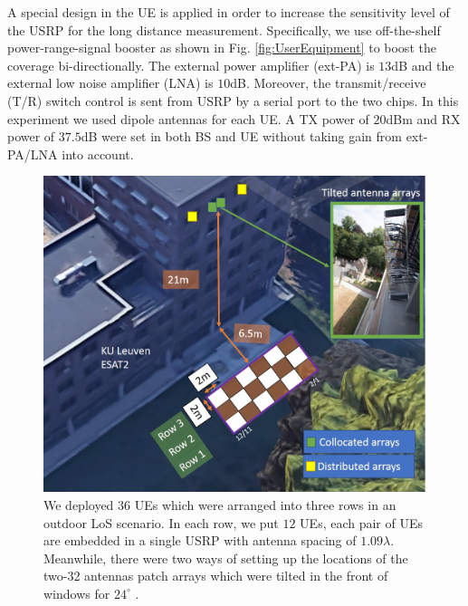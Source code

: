 A special design in the UE is applied in order to increase the sensitivity level of the USRP for the long distance measurement. Specifically, we use off-the-shelf power-range-signal booster as shown in Fig. \ref{fig:UserEquipment} to boost the coverage bi-directionally. The external power amplifier (ext-PA) is $13$dB and the external low noise amplifier (LNA) is $10$dB. Moreover, the transmit/receive (T/R) switch control is sent from USRP by a serial port to the two chips. In this experiment we used dipole antennas for each UE. A TX power of $20$dBm and RX power of $37.5$dB were set in both BS and UE without taking gain from ext-PA/LNA into account.
\begin{figure}[t!]
	\centering
	\includegraphics[width=1.0\linewidth]{figures/outdoor_scenario.jpg}
	\caption{We deployed $36$ UEs which were arranged into three rows in an outdoor LoS scenario. In each row, we put $12$ UEs, each pair of UEs are embedded in a single USRP with antenna spacing of $1.09\lambda$. Meanwhile, there were two ways of setting up the locations of the two-32 antennas patch arrays which were tilted in the front of windows for $24^\circ$ .}
	\label{fig:The measured outdoor scenario}
\end{figure}
